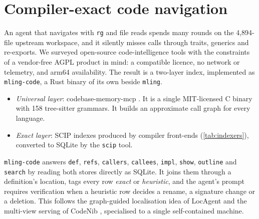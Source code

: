 \documentclass[11pt]{article}
\newcommand{\code}[1]{\texttt{#1}}
\begin{document}
\section{Compiler-exact code navigation}
\label{sec:index}

An agent that navigates with \code{rg} and file reads spends many rounds on the 4{,}894-file
upstream workspace, and it silently misses calls through traits, generics and re-exports. We
surveyed open-source code-intelligence tools with the constraints of a vendor-free AGPL product in
mind: a compatible licence, no network or telemetry, and arm64 availability. The result is a
two-layer index, implemented as \code{mling-code}, a Rust binary of its own beside \code{mling}.
\begin{itemize}
  \item \emph{Universal layer}: codebase-memory-mcp \cite{codebasememorymcp,vogel2026codebasememory}.
    It is a single MIT-licensed C binary with 158 tree-sitter \cite{treesitter} grammars. It builds
    an approximate call graph for every language.
  \item \emph{Exact layer}: SCIP \cite{scip} indexes produced by compiler front-ends
    (\cref{tab:indexers}), converted to SQLite by the \code{scip} tool.
\end{itemize}
\code{mling-code} answers \code{def}, \code{refs}, \code{callers}, \code{callees}, \code{impl},
\code{show}, \code{outline} and \code{search} by reading both stores directly as SQLite. It joins
them through a definition's location, tags every row \emph{exact} or \emph{heuristic}, and the
agent's prompt requires verification when a heuristic row decides a rename, a signature change
or a deletion. This follows the graph-guided localisation idea of LocAgent
\cite{chen2025locagent} and the multi-view serving of CodeNib \cite{yu2026codenib}, specialised to
a single self-contained machine.
\end{document}
